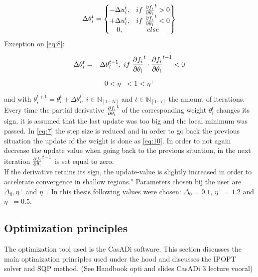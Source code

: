 \begin{equation}\label{eq:8}
\Delta \theta^t_i =
\begin{Bmatrix}
	-\Delta u^t_i, & if \hspace{1 mm} \pdv{f_i}{\theta_i}^t > 0 \\
	+ \Delta u^t_i, & if \hspace{1 mm} \pdv{f_i}{\theta_i}^t < 0 \\
	0, & else 
\end{Bmatrix}
\end{equation}
Exception on \ref{eq:8}:

\begin{equation}\label{eq:10}
	\Delta \theta^t_i = -\Delta \theta^{t-1}_i, \hspace{1mm} if \hspace{1mm} \pdv{f_i}{\theta_i}^t \cdot \pdv{f_i}{\theta_i}^{t-1} < 0
\end{equation}

\begin{equation}\label{eq:9}
	0 <\eta^-<1<\eta^+
\end{equation}

and with $\theta_i^{t+1} = \theta_i^{t} + \Delta \theta^t_i$, $i \in \mathbb{N}_{[1\cdots N]}$ and $t \in \mathbb{N}_[1 \cdots \mathbb{\tau}]$ the amount of iterations. Every time the partial derivative $\pdv{f_i}{\theta_i}^t$ of the corresponding weight $\theta_i^t$ changes its sign, it is assumed that the last update was too big and the local minimum was passed. In \ref{eq:7} the step size is reduced and in order to go back the previous situation the update of the weight is done as \ref{eq:10}. In order to not again decrease the update value when going back to the previous situation, in the next iteration $\pdv{f_i}{\theta_i}^{t-1}$ is set equal to zero.\\
If the derivative retains its sign, the update-value is slightly increased in order to accelerate convergence in shallow regions." \cite{RPROP} Parameters chosen bij the user are $\Delta_0, \eta^+$ and $\eta^-$. In this thesis following values were chosen: $\Delta_0 = 0.1$, $\eta^+ = 1.2$ and $\eta^- = 0.5$.

\subsection{Optimization principles}
The optimization tool used is the CasADi software. This section discusses the main optimization principles used under the hood and discusses the IPOPT solver and SQP method. (See Handbook opti and slides CasADi 3 lecture vooral)


